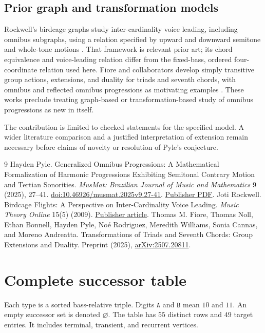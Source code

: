 \documentclass[11pt,letterpaper]{article}
\theoremstyle{definition}\newtheorem{definition}[theorem]{Definition}
\newcommand{\typ}[1]{\mathtt{#1}}
\begin{document}
\subsection{Prior graph and transformation models}
Rockwell's birdcage graphs study inter-cardinality voice leading, including omnibus subgraphs, using a relation specified by upward and downward semitone and whole-tone motions \cite{rockwell}. That framework is relevant prior art; its chord equivalence and voice-leading relation differ from the fixed-bass, ordered four-coordinate relation used here. Fiore and collaborators develop simply transitive group actions, extensions, and duality for triads and seventh chords, with omnibus and reflected omnibus progressions as motivating examples \cite{fiore}. These works preclude treating graph-based or transformation-based study of omnibus progressions as new in itself.

The contribution is limited to checked statements for the specified model. A wider literature comparison and a justified interpretation of extension remain necessary before claims of novelty or resolution of Pyle's conjecture.

\begin{thebibliography}{9}\small
\setlength{\itemsep}{2pt}\setlength{\parskip}{0pt}
 Hayden Pyle. Generalized Omnibus Progressions: A Mathematical Formalization of Harmonic Progressions Exhibiting Semitonal Contrary Motion and Tertian Sonorities. \emph{MusMat: Brazilian Journal of Music and Mathematics} 9 (2025), 27--41. \href{https://doi.org/10.46926/musmat.2025v9.27-41}{doi:10.46926/musmat.2025v9.27-41}. \href{https://musmat.org/journal/v9/02-Pyle.pdf}{Publisher PDF}.
 Joti Rockwell. Birdcage Flights: A Perspective on Inter-Cardinality Voice Leading. \emph{Music Theory Online} 15(5) (2009). \href{https://www.mtosmt.org/issues/mto.09.15.5/mto.09.15.5.rockwell.html}{Publisher article}.
 Thomas M. Fiore, Thomas Noll, Ethan Bonnell, Hayden Pyle, No\'e Rodriguez, Meredith Williams, Sonia Cannas, and Moreno Andreatta. Transformations of Triads and Seventh Chords: Group Extensions and Duality. Preprint (2025), \href{https://arxiv.org/abs/2507.20811}{arXiv:2507.20811}.
\end{thebibliography}

\clearpage
\appendix
\section{Complete successor table}\label{app:graph}
Each type is a sorted bass-relative triple. Digits $\typ{A}$ and $\typ{B}$ mean $10$ and $11$. An empty successor set is denoted $\varnothing$. The table has $55$ distinct rows and $49$ target entries. It includes terminal, transient, and recurrent vertices.
\end{document}
